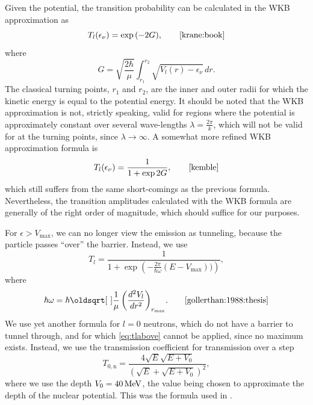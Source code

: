 Given the potential, the transition probability can be calculated in the WKB approximation as 
\begin{equation}
T_l(\epsilon_\nu) = \exp{(-2G)},\qquad\cite{krane:book}
\end{equation}
where 
\begin{equation}
G=\sqrt{\frac{2\hbar}{\mu}} \int_{r_1}^{r_2} \sqrt{V_l(r)-\epsilon_{\nu}}\,dr.
\end{equation}
The classical turning points, $r_1$ and $r_2$, are the inner and outer radii for which the kinetic energy is equal to the potential energy. It should be noted that the WKB approximation is not, strictly speaking, valid for regions where the potential is approximately constant over several wave-lengths $\lambda=\frac{2\pi}{k}$, which will not be valid for at the turning points, since $\lambda \to \infty$. 
A somewhat more refined WKB approximation formula is
\begin{equation}
T_l(\epsilon_\nu) = \frac{1}{1+\exp{2G}},\qquad\cite{kemble}
\end{equation}
 which still suffers from the same short-comings as the previous formula. Nevertheless, the transition amplitudes calculated with the WKB formula are generally of the right order of magnitude, which should suffice for our purposes\cite{2011arXiv1106.1065N}.

For $\epsilon>V_\text{max}$, we can no longer view the emission as tunneling, because the particle passes ``over'' the barrier. Instead, we use
\begin{equation}
T_l = \frac{1}{1+\exp{\left(-\frac{2\pi}{\hbar \omega}(E-V_\text{max}))\right)}},\label{eq:tlabove}
\end{equation}
where
\begin{equation}
\hbar\omega = \hbar\sqrt{\frac{1}{\mu}\left(\frac{d^2V_l}{dr^2}\right)_{r_\text{max}}}.\qquad\cite{gollerthan:1988:thesis}
\end{equation}
We use yet another formula for $l=0$ neutrons, which do not have a barrier to tunnel through, and for which \autoref{eq:tlabove} cannot be applied, since no maximum exists. Instead, we use the transmission coefficient for transmission over a step 
\begin{equation}
T_{0,\text{n}} = \frac{4\sqrt{E}\sqrt{E+V_0}}{(\sqrt{E}+\sqrt{E+V_0})^2},\label{eq:t0n}
\end{equation}
where we use the depth $V_0=\unit[40]{MeV}$, the value being chosen to approximate the depth of the nuclear potential\cite{welldepth}. This was the formula used in .

